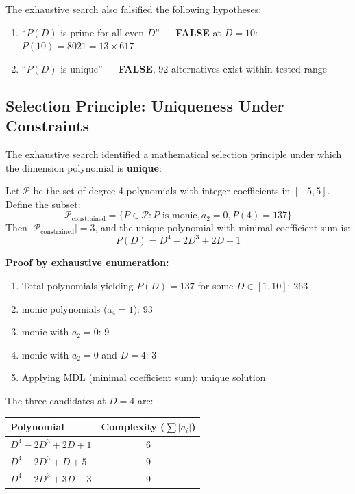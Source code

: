 \documentclass[11pt,a4paper]{article}
\begin{document}
The exhaustive search also falsified the following hypotheses:

\begin{enumerate}
    \item ``$P(D)$ is prime for all even $D$'' --- \textbf{FALSE} at $D=10$: $P(10) = 8021 = 13 \times 617$
    \item ``$P(D)$ is unique'' --- \textbf{FALSE}, 92 alternatives exist within tested range
\end{enumerate}

\subsection{Selection Principle: Uniqueness Under Constraints}

The exhaustive search identified a mathematical selection principle under which the dimension polynomial is \textbf{unique}:

\begin{theorem}
Let $\mathcal{P}$ be the set of degree-4 polynomials with integer coefficients in $[-5, 5]$.
Define the subset:
\[
\mathcal{P}_{\text{constrained}} = \{P \in \mathcal{P} : P \text{ is monic}, a_2 = 0, P(4) = 137\}
\]
Then $|\mathcal{P}_{\text{constrained}}| = 3$, and the unique polynomial with minimal coefficient sum is:
\[
P(D) = D^4 - 2D^3 + 2D + 1
\]
\end{theorem}

\textbf{Proof by exhaustive enumeration:}
\begin{enumerate}
    \item Total polynomials yielding $P(D) = 137$ for some $D \in [1,10]$: 263
    \item monic polynomials (a$_4 = 1$): 93
    \item monic with $a_2 = 0$: 9
    \item monic with $a_2 = 0$ and $D = 4$: 3
    \item Applying MDL (minimal coefficient sum): unique solution
\end{enumerate}

The three candidates at $D=4$ are:
\begin{center}
\begin{tabular}{lc}
Polynomial & Complexity ($\sum |a_i|$) \\
\hline
$D^4 - 2D^3 + 2D + 1$ & 6 \\
$D^4 - 2D^3 + D + 5$ & 9 \\
$D^4 - 2D^3 + 3D - 3$ & 9 \\
\end{tabular}
\end{center}
\end{document}

